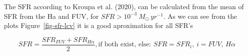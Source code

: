\documentclass[
]{article}
\begin{document}
The SFR according to Kroupa et al. (2020), can be calculated from the
mean of SFR from the Ha and FUV, for \(SFR>10^{-3}\ M_\odot\, yr^{-1}\).
As we can see from the plots Figure~\ref{fig-sfr-lcv} it is a good
aproximation for all SFR's

\[
SFR = \frac{SFR_{FUV}+SFR_{H\alpha}}{2}, \text{if both exist, else: } SFR = SFR_i,\ i= FUV,\, H\alpha
\]

\begin{figure}

\begin{minipage}{0.50\linewidth}



\end{minipage}%
%
\begin{minipage}{0.50\linewidth}

\end{minipage}
\end{figure}
\end{document}
